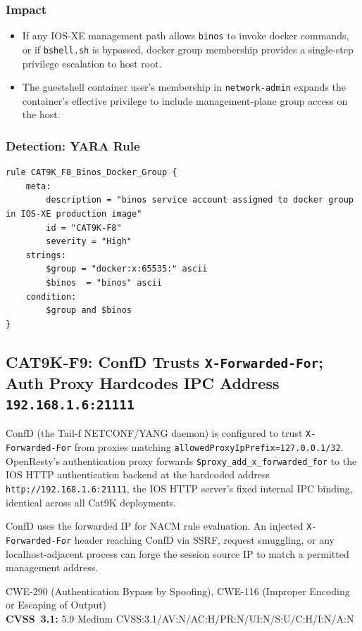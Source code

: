 \documentclass[11pt,a4paper]{article}
\begin{document}
\subsubsection{Impact}

\begin{itemize}[nosep]
  \item If any IOS-XE management path allows \texttt{binos} to invoke docker commands,
    or if \texttt{bshell.sh} is bypassed, docker group membership provides a
    single-step privilege escalation to host root.
  \item The guestshell container user's membership in \texttt{network-admin} expands
    the container's effective privilege to include management-plane group access on
    the host.
\end{itemize}

\subsubsection{Detection: YARA Rule}

\begin{lstlisting}[style=yara]
rule CAT9K_F8_Binos_Docker_Group {
    meta:
        description = "binos service account assigned to docker group in IOS-XE production image"
        id = "CAT9K-F8"
        severity = "High"
    strings:
        $group = "docker:x:65535:" ascii
        $binos  = "binos" ascii
    condition:
        $group and $binos
}
\end{lstlisting}

\subsection{CAT9K-F9: ConfD Trusts \texorpdfstring{\texttt{X-Forwarded-For}}{X-Forwarded-For}; Auth Proxy Hardcodes IPC Address \texttt{192.168.1.6:21111}}

\begin{overviewbox}
ConfD (the Tail-f NETCONF/YANG daemon) is configured to trust \texttt{X-Forwarded-For}
from proxies matching \texttt{allowedProxyIpPrefix=127.0.0.1/32}. OpenResty's
authentication proxy forwards \texttt{\$proxy\_add\_x\_forwarded\_for} to the IOS
HTTP authentication backend at the hardcoded address \texttt{http://192.168.1.6:21111},
the IOS HTTP server's fixed internal IPC binding, identical across all Cat9K
deployments.

ConfD uses the forwarded IP for NACM rule evaluation. An injected
\texttt{X-Forwarded-For} header reaching ConfD via SSRF, request smuggling, or any
localhost-adjacent process can forge the session source IP to match a permitted
management address.

CWE-290 (Authentication Bypass by Spoofing), CWE-116 (Improper Encoding or Escaping of Output)\\
\textbf{CVSS~3.1:} 5.9 Medium \quad CVSS:3.1/AV:N/AC:H/PR:N/UI:N/S:U/C:H/I:N/A:N
\end{overviewbox}
\end{document}
